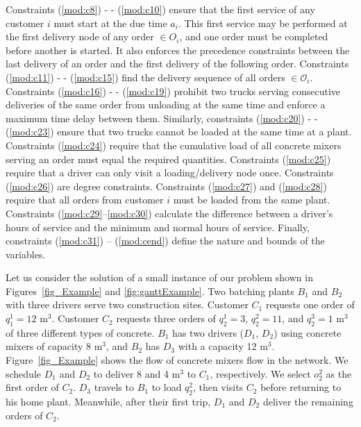 \documentclass{article}
\begin{document}
Constraints (\ref{mod:c8}) - - (\ref{mod:c10}) ensure that the first service of any customer $i$ must start at the due time $a_i$. This first service may be performed at the first delivery node of any order $\in O_i$, and one order must be completed before another is started. It also enforces the precedence constraints between the last delivery of an order and the first delivery of the following order.
Constraints (\ref{mod:c11}) - - (\ref{mod:c15}) find the delivery sequence of all orders $\in \mathcal{O}_i$. Constraints (\ref{mod:c16}) - - (\ref{mod:c19}) prohibit two trucks serving consecutive deliveries of the same order from unloading at the same time and enforce a maximum time delay between them. Similarly, constraints (\ref{mod:c20}) - - (\ref{mod:c23}) ensure that two trucks cannot be loaded at the same time at a plant. Constraints (\ref{mod:c24}) require that the cumulative load of all concrete mixers serving an order must equal the required quantities. Constraints (\ref{mod:c25}) require that a driver can only visit a loading/delivery node once. Constraints (\ref{mod:c26}) are degree constraints. Constraints (\ref{mod:c27}) and (\ref{mod:c28}) require that all orders from customer $i$ must be loaded from the same plant. Constraints (\ref{mod:c29}--\ref{mod:c30}) calculate the difference between a driver's hours of service and the minimum and normal hours of service. Finally, constraints (\ref{mod:c31}) -- (\ref{mod:cend}) define the nature and bounds of the variables.
 
Let us consider the solution of a small instance of our problem shown in Figures~\ref{fig_Example} and \ref{fig:ganttExample}. Two batching plants $B_1$ and $B_2$ with three drivers serve two construction sites. Customer $C_1$ requests one order of $q^1_1=12$ m$^3$. Customer $C_2$ requests three orders of $q^1_2=3$, $q^2_2=11$, and $q^3_2=1$ m$^3$ of three different types of concrete. $B_1$ has two drivers ($D_1$, $D_2$) using concrete mixers of capacity 8 m$^3$, and $B_2$ has $D_3$ with a capacity 12 m$^3$. Figure~\ref{fig_Example} shows the flow of concrete mixers flow in the network. We schedule $D_1$ and $D_2$ to deliver 8 and 4 m$^3$ to $C_1$, respectively. We select $o^2_2$ as the first order of $C_2$. $D_3$ travels to $B_1$ to load $q^2_2$, then visits $C_2$ before returning to his home plant. Meanwhile, after their first trip,  $D_1$ and $D_2$ deliver the remaining orders of $C_2$.
\end{document}
